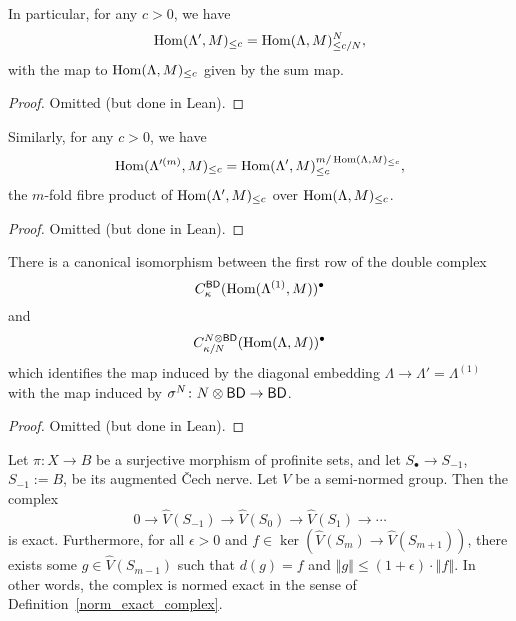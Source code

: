 \begin{lemma}
  \label{canonical_iso_1}
  \leanok
  In particular, for any $c>0$, we have
  \[
    \operatorname{Hom}(\Lambda',M)_{\leq c} = \operatorname{Hom}(\Lambda,M)_{\leq c/N}^N,
  \]
  with the map to $\operatorname{Hom}(\Lambda,M)_{\leq c}$ given by the sum map.
\end{lemma}

\begin{proof}
  \leanok
  Omitted (but done in Lean).
\end{proof}

\begin{lemma}
  \label{canonical_iso_2}
  \leanok
  Similarly, for any $c>0$, we have
  \[
    \operatorname{Hom}(\Lambda'^{(m)},M)_{\leq c} =
    \operatorname{Hom}(\Lambda',M)_{\leq c}^{m/\operatorname{Hom}(\Lambda,M)_{\leq c}},
  \]
  the $m$-fold fibre product of $\operatorname{Hom}(\Lambda',M)_{\leq c}$
  over $\operatorname{Hom}(\Lambda,M)_{\leq c}$.
\end{lemma}

\begin{proof}
  \leanok
  Omitted (but done in Lean).
\end{proof}

\begin{lemma}
  \label{row_one_iso}
  \leanok
  There is a canonical isomorphism between the first row of the double complex
  \[
    C^{\mathsf{BD}}_{\kappa}(\operatorname{Hom}(\Lambda^{(1)}, M))^\bullet
  \]
  and
  \[
    C^{N \otimes \mathsf{BD}}_{\kappa/N}(\operatorname{Hom}(\Lambda, M))^\bullet
  \]
  which identifies the map induced by
  the diagonal embedding $\Lambda \to \Lambda' = \Lambda^{(1)}$
  with the map induced by $\sigma^N \colon N \otimes \mathsf{BD} \to \mathsf{BD}$.
\end{lemma}

\begin{proof}
  \leanok
  Omitted (but done in Lean).
\end{proof}

\begin{proposition}
  \label{cechcover-exact}
  \leanok
  Let $\pi : X \to B$ be a surjective morphism of profinite sets,
  and let $S_\bullet \to S_{-1}$, $S_{-1} := B$, be its augmented \v{C}ech nerve.
  Let $V$ be a semi-normed group.
  Then the complex
  \[
    0\to \widehat{V}(S_{-1})\to \widehat{V}(S_0)\to \widehat{V}(S_1)\to \cdots
  \]
  is exact.
  Furthermore, for all $\epsilon > 0$ and $f \in \ker(\widehat{V}(S_{m}) \to \widehat{V}(S_{m+1}))$,
  there exists some $g\in \widehat{V}(S_{m-1})$ such that $d(g) = f$ and $‖g‖\leq (1+\epsilon) \cdot ‖f‖$.
  In other words, the complex is normed exact in the sense of Definition~\ref{norm_exact_complex}.
\end{proposition}

